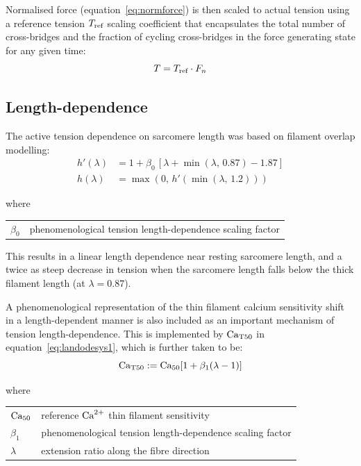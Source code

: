 \vspace{0.3cm}\noindent
Normalised force (equation~\eqref{eq:normforce}) is then scaled to actual tension using a reference tension $T_{\textrm{ref}}$ scaling coefficient that encapsulates the total number of cross-bridges and the fraction of cycling cross-bridges in the force generating state for any given time:
%
\begin{equation}
    T = T_{\textrm{ref}}\cdot F_n
\end{equation}
 
%
%
%
\subsection{Length-dependence}
The active tension dependence on sarcomere length was based on filament overlap modelling:
%
\begin{align}
    h'(\lambda) &= 1+\beta_0\,[\lambda+\min(\lambda,\,0.87)-1.87] \\
    h(\lambda) &= \max(0,\,h'(\min(\lambda,\,1.2)))
\end{align}

\noindent
where

\vspace{0.2cm}
\begin{tabular}{ll}
    $\beta_0$ & phenomenological tension length-dependence scaling factor
\end{tabular}

\vspace{0.3cm}\noindent
This results in a linear length dependence near resting sarcomere length, and a twice as steep decrease in tension when the sarcomere length falls below the thick filament length (at $\lambda = 0.87$).

\vspace{0.2cm}
A phenomenological representation of the thin filament calcium sensitivity shift in a length-dependent manner is also included as an important mechanism of tension length-dependence. This is implemented by $\textrm{Ca}_{\textrm{T}50}$ in equation~\eqref{eq:landodesys1}, which is further taken to be:
%
\begin{equation}\label{eq:Caift}
    \textrm{Ca}_{\textrm{T}50}:=\textrm{Ca}_{50}[1 + \beta_1(\lambda - 1)]
\end{equation}

\noindent
where

\vspace{0.2cm}
\begin{tabular}{ll}
    $\textrm{Ca}_{50}$   & reference $\textrm{Ca}^{2+}$ thin filament sensitivity \\
    $\beta_1$ & phenomenological tension length-dependence scaling factor \\
    $\lambda$ & extension ratio along the fibre direction
\end{tabular}


